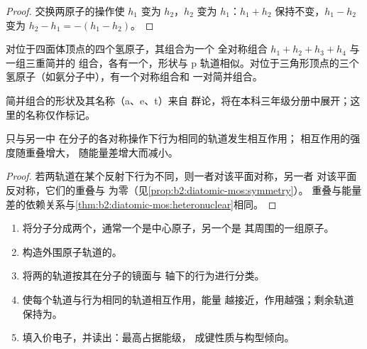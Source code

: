 \begin{proof}
交换两原子的操作使 $h_1$ 变为 $h_2$，$h_2$ 变为
$h_1$：$h_1 + h_2$ 保持不变，$h_1 - h_2$ 变为 $h_2 - h_1 = -(h_1 - h_2)$。
\end{proof}

\begin{proposition}[三个与四个氢原子]\label{prop:b2:fragment-orbitals:h4}
对位于四面体顶点的四个氢原子，其组合为一个
全对称组合 $h_1 + h_2 + h_3 + h_4$ 与一组三重简并的
组合，各有一个，形状与 p 轨道相似。对位于三角形顶点的三个
氢原子（如氨分子中），有一个对称组合和
一对简并组合。
\end{proposition}

\admitted

简并组合的形状及其名称（a、e、t）来自
群论，将在本科三年级分册中展开；这里的名称仅作标记。

\begin{proposition}[只有同类相互作用]\label{prop:b2:fragment-orbitals:interaction-rules}
只与另一中
在分子的各对称操作下行为相同的轨道发生相互作用；
相互作用的强度随重叠增大，
随能量差增大而减小。
\end{proposition}

\begin{proof}
若两轨道在某个反射下行为不同，则一者对该平面对称，另一者
对该平面反对称，它们的重叠与
为零（见\cref{prop:b2:diatomic-mos:symmetry}）。
重叠与能量差的依赖关系与\cref{thm:b2:diatomic-mos:heteronuclear}相同。
\end{proof}

\begin{method}[片段图]\label{met:b2:fragment-orbitals:fragment-diagram}
\begin{enumerate}
  \item 将分子分成两个，通常一个是中心原子，另一个是
        其周围的一组原子。
  \item 构造外围原子轨道的。
  \item 将两的轨道按其在分子的镜面与
        轴下的行为进行分类。
  \item 使每个轨道与行为相同的轨道相互作用，能量
        越接近，作用越强；剩余轨道保持为。
  \item 填入价电子，并读出：最高占据能级，
        成键性质与构型倾向。
\end{enumerate}
\end{method}

